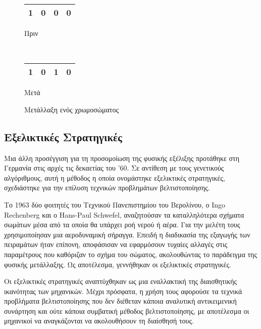 \begin{figure}[!t]
    \centering
    \begin{subtable}[b]{.4\linewidth}
        \centering
        \begin{tabular}{|c|c|c|c|}
            \hline
            1 & 0 & \cellcolor{gray!25}0 & 0\\
            \hline
        \end{tabular}
        \caption{Πριν}
        \label{fig_beforeMutation}
    \end{subtable}
    ~
    \begin{subtable}[b]{.3\linewidth}
        \centering
        \begin{tabular}{|c|c|c|c|}
            \hline
            1 & 0 & \cellcolor{gray!25}1 & 0\\
            \hline
        \end{tabular}
        \caption{Μετά}
        \label{fig_afterMutation}
    \end{subtable}
    \caption{Μετάλλαξη ενός χρωμοσώματος}
    \label{fig_mutation}
\end{figure}

\subsection{Εξελικτικές Στρατηγικές}
Μια άλλη προσέγγιση για τη προσομοίωση της φυσικής εξέλιξης προτάθηκε στη Γερμανία στις αρχές τις δεκαετίας του '60. Σε αντίθεση με τους γενετικούς αλγόριθμους, αυτή η μέθοδος η οποία ονομάστηκε εξελικτικές στρατηγικές, σχεδιάστηκε για την επίλυση τεχνικών προβλημάτων βελτιστοποίησης.

Το 1963 δύο φοιτητές του Τεχνικού Πανεπιστημίου του Βερολίνου, ο Ingo Rechenberg και ο Hans-Paul Schwefel, αναζητούσαν τα καταλληλότερα σχήματα σωμάτων μέσα από τα οποία θα υπάρχει ροή νερού ή αέρα. Για την μελέτη τους χρησιμοποίησαν μια αεροδυναμική σήραγγα. Επειδή η διαδικασία της εξαγωγής των πειραμάτων ήταν επίπονη, αποφάσισαν να εφαρμόσουν τυχαίες αλλαγές στις παραμέτρους που καθόριζαν το σχήμα του σώματος, ακολουθώντας το παράδειγμα της φυσικής μετάλλαξης. Ως αποτέλεσμα, γεννήθηκαν οι εξελικτικές στρατηγικές.

Οι εξελικτικές στρατηγικές αναπτύχθηκαν ως μια εναλλακτική της διαισθητικής ικανότητας των μηχανικών. Μέχρι πρόσφατα, η χρήση τους αφορούσε τα τεχνικά προβλήματα βελτιστοποίησης που δεν διέθεταν κάποια αναλυτική αντικειμενική συνάρτηση και ούτε κάποια συμβατική μέθοδος βελτιστοποίησης, με αποτέλεσμα οι μηχανικοί να αναγκάζονται να ακολουθήσουν τη διαίσθησή τους.

